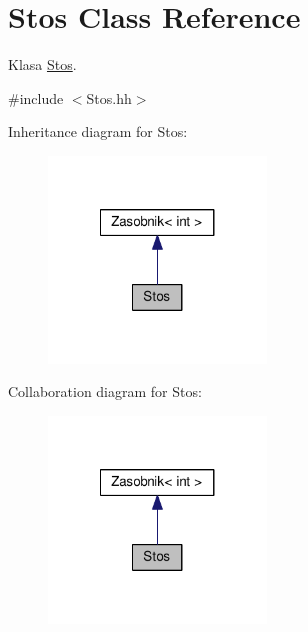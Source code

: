 \hypertarget{a00018}{}\section{Stos Class Reference}
\label{a00018}


Klasa \hyperlink{a00018}{Stos}.  




{\ttfamily \#include $<$Stos.\+hh$>$}



Inheritance diagram for Stos\+:
\nopagebreak
\begin{figure}[H]
\begin{center}
\leavevmode
\includegraphics[width=164pt]{a00165}
\end{center}
\end{figure}


Collaboration diagram for Stos\+:
\nopagebreak
\begin{figure}[H]
\begin{center}
\leavevmode
\includegraphics[width=164pt]{a00166}
\end{center}
\end{figure}
